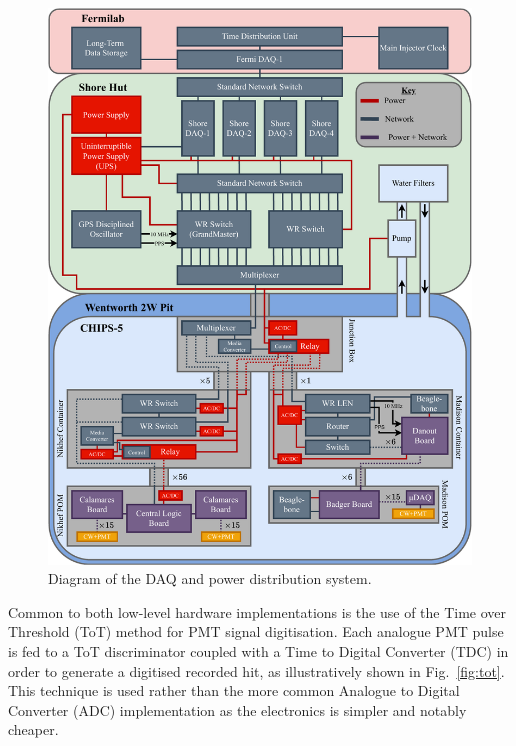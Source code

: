 \begin{figure} %
    \includegraphics[width=\textwidth]{diagrams/5-daq/daq.pdf}
    \caption[Diagram of the \chipsfive data acquisition and power distribution system.]
    {Diagram of the \chipsfive DAQ and power distribution system.}
    \label{fig:daq}
\end{figure}

Common to both low-level hardware implementations is the use of the Time over Threshold (ToT)
method for PMT signal digitisation. Each analogue PMT pulse is fed to a ToT discriminator coupled
with a Time to Digital Converter (TDC) in order to generate a digitised recorded hit, as
illustratively shown in Fig.~\ref{fig:tot}. This technique is used rather than the more common
Analogue to Digital Converter (ADC) implementation as the electronics is simpler and notably
cheaper.

